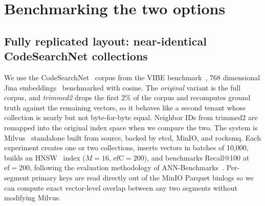 \section{Benchmarking the two options}
\label{sec:setup}

\subsection{Fully replicated layout: near-identical CodeSearchNet collections}

 We use the
CodeSearchNet~\cite{husain2019codesearchnet} corpus from the VIBE
benchmark~\cite{vibe2024}, 768 dimensional Jina
embeddings~\cite{gunther2023jina} benchmarked with cosine. The
\textit{original} variant is the full corpus, and \textit{trimmed2} drops
the first 2\% of the corpus and recomputes ground truth against the
remaining vectors, so it behaves like a second tenant whose collection is
nearly but not byte-for-byte equal. Neighbor IDs from trimmed2 are
remapped into the original index space when we compare the two. The
system is Milvus~\cite{wang2021milvus} standalone built from source,
backed by etcd, MinIO, and rocksmq. Each experiment creates one or two
collections, inserts vectors in batches of 10{,}000, builds an
HNSW~\cite{malkov2018hnsw} index ($M{=}16$, $\text{efC}{=}200$), and
benchmarks Recall@100 at $\text{ef}{=}200$, following the evaluation
methodology of ANN-Benchmarks~\cite{aumuller2020annbenchmarks}.
Per-segment primary keys are read directly out of the MinIO Parquet
binlogs so we can compute exact vector-level overlap between any two
segments without modifying Milvus.

